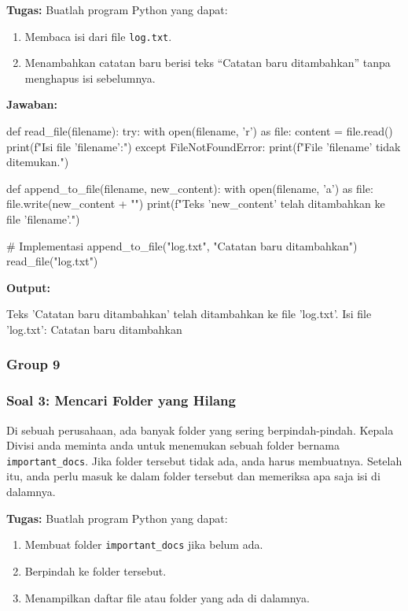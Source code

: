 \documentclass[12pt]{article}
\begin{document}
\textbf{Tugas:} Buatlah program Python yang dapat:
\begin{enumerate}
    \item Membaca isi dari file \texttt{log.txt}.
    \item Menambahkan catatan baru berisi teks ``Catatan baru ditambahkan'' tanpa menghapus isi sebelumnya.
\end{enumerate}

\textbf{Jawaban:}
\begin{python}
def read_file(filename):
    try:
        with open(filename, 'r') as file:
            content = file.read()
            print(f"Isi file '{filename}':")
    except FileNotFoundError:
        print(f"File '{filename}' tidak ditemukan.")

def append_to_file(filename, new_content):
    with open(filename, 'a') as file:
        file.write(new_content + "\n")
    print(f"Teks '{new_content}' telah ditambahkan ke file '{filename}'.")

# Implementasi
append_to_file("log.txt", "Catatan baru ditambahkan")
read_file("log.txt")
\end{python}

\textbf{Output:}
\begin{python}
Teks 'Catatan baru ditambahkan' telah ditambahkan ke file 'log.txt'.
Isi file 'log.txt':
Catatan baru ditambahkan
\end{python}

\subsubsection{Group 9}
\subsubsection*{Soal 3: Mencari Folder yang Hilang}
Di sebuah perusahaan, ada banyak folder yang sering berpindah-pindah. Kepala Divisi anda meminta anda untuk menemukan sebuah folder bernama \texttt{important\_docs}. Jika folder tersebut tidak ada, anda harus membuatnya. Setelah itu, anda perlu masuk ke dalam folder tersebut dan memeriksa apa saja isi di dalamnya.

\textbf{Tugas:} Buatlah program Python yang dapat:
\begin{enumerate}
    \item Membuat folder \texttt{important\_docs} jika belum ada.
    \item Berpindah ke folder tersebut.
    \item Menampilkan daftar file atau folder yang ada di dalamnya.
\end{enumerate}
\end{document}
